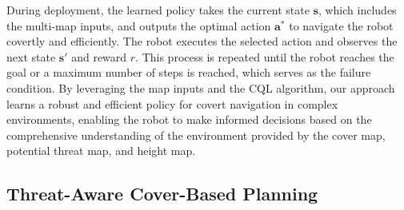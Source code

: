 During deployment, the learned policy takes the current state $\mathbf{s}$, which includes the multi-map inputs, and outputs the optimal action $\mathbf{a}^*$ to navigate the robot covertly and efficiently. The robot executes the selected action and observes the next state $\mathbf{s}'$ and reward $r$. This process is repeated until the robot reaches the goal or a maximum number of steps is reached,  which serves as the failure condition. By leveraging the map inputs and the CQL algorithm, our approach learns a robust and efficient policy for covert navigation in complex environments, enabling the robot to make informed decisions based on the comprehensive understanding of the environment provided by the cover map, potential threat map, and height map.


\subsection{Threat-Aware Cover-Based Planning}




